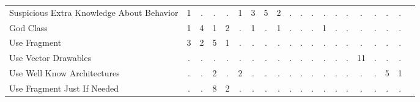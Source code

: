 \begin{table*}[t]
\begin{tabular}{p{4cm}|p{.3cm}p{.3cm}p{.3cm}p{.3cm}p{.3cm}p{.3cm}p{.3cm}p{.3cm}p{.3cm}p{.4cm}p{.4cm}p{.4cm}p{.4cm}p{.4cm}p{.4cm}p{.4cm}p{.4cm}p{.4cm}p{.4cm}}
Suspicious Extra Knowledge About Behavior			& \multicolumn{1}{c}{1}	& \multicolumn{1}{c}{.}	& \multicolumn{1}{c}{.}	& \multicolumn{1}{c}{.}	& \multicolumn{1}{c}{1}	& \multicolumn{1}{c}{3}	& \multicolumn{1}{c}{5}	& \multicolumn{1}{c}{2}	& \multicolumn{1}{c}{.}	& \multicolumn{1}{c}{.}	& \multicolumn{1}{c}{.}	& \multicolumn{1}{c}{.}	& \multicolumn{1}{c}{.}	& \multicolumn{1}{c}{.}	& \multicolumn{1}{c}{.}	& \multicolumn{1}{c}{.}	& \multicolumn{1}{c}{.}	& \multicolumn{1}{c}{.} 		 \\
God Class											& \multicolumn{1}{c}{1}	& \multicolumn{1}{c}{4}	& \multicolumn{1}{c}{1}	& \multicolumn{1}{c}{2}	& \multicolumn{1}{c}{.}	& \multicolumn{1}{c}{1}	& \multicolumn{1}{c}{.}	& \multicolumn{1}{c}{1}	& \multicolumn{1}{c}{.}	& \multicolumn{1}{c}{.}	& \multicolumn{1}{c}{.}	& \multicolumn{1}{c}{1}	& \multicolumn{1}{c}{.}	& \multicolumn{1}{c}{.}	& \multicolumn{1}{c}{.}	& \multicolumn{1}{c}{.}	& \multicolumn{1}{c}{.}	& \multicolumn{1}{c}{.} 		 \\
Use Fragment										& \multicolumn{1}{c}{3}	& \multicolumn{1}{c}{2}	& \multicolumn{1}{c}{5}	& \multicolumn{1}{c}{1}	& \multicolumn{1}{c}{.}	& \multicolumn{1}{c}{.}	& \multicolumn{1}{c}{.}	& \multicolumn{1}{c}{.}	& \multicolumn{1}{c}{.}	& \multicolumn{1}{c}{.}	& \multicolumn{1}{c}{.}	& \multicolumn{1}{c}{.}	& \multicolumn{1}{c}{.}	& \multicolumn{1}{c}{.}	& \multicolumn{1}{c}{.}	& \multicolumn{1}{c}{.}	& \multicolumn{1}{c}{.}	& \multicolumn{1}{c}{.} 		 \\
Use Vector Drawables								& \multicolumn{1}{c}{.}	& \multicolumn{1}{c}{.}	& \multicolumn{1}{c}{.}	& \multicolumn{1}{c}{.}	& \multicolumn{1}{c}{.}	& \multicolumn{1}{c}{.}	& \multicolumn{1}{c}{.}	& \multicolumn{1}{c}{.}	& \multicolumn{1}{c}{.}	& \multicolumn{1}{c}{.}	& \multicolumn{1}{c}{.}	& \multicolumn{1}{c}{.}	& \multicolumn{1}{c}{.}	& \multicolumn{1}{c}{.}	& \multicolumn{1}{c}{11}	& \multicolumn{1}{c}{.}	& \multicolumn{1}{c}{.}	& \multicolumn{1}{c}{.} 	 \\
Use Well Know Architectures							& \multicolumn{1}{c}{.}	& \multicolumn{1}{c}{.}	& \multicolumn{1}{c}{2}	& \multicolumn{1}{c}{.}	& \multicolumn{1}{c}{2}	& \multicolumn{1}{c}{.}	& \multicolumn{1}{c}{.}	& \multicolumn{1}{c}{.}	& \multicolumn{1}{c}{.}	& \multicolumn{1}{c}{.}	& \multicolumn{1}{c}{.}	& \multicolumn{1}{c}{.}	& \multicolumn{1}{c}{.}	& \multicolumn{1}{c}{.}	& \multicolumn{1}{c}{.}	& \multicolumn{1}{c}{.}	& \multicolumn{1}{c}{5}	& \multicolumn{1}{c}{1} 		 \\
Use Fragment Just If Needed							& \multicolumn{1}{c}{.}	& \multicolumn{1}{c}{.}	& \multicolumn{1}{c}{8}	& \multicolumn{1}{c}{2}	& \multicolumn{1}{c}{.}	& \multicolumn{1}{c}{.}	& \multicolumn{1}{c}{.}	& \multicolumn{1}{c}{.}	& \multicolumn{1}{c}{.}	& \multicolumn{1}{c}{.}	& \multicolumn{1}{c}{.}	& \multicolumn{1}{c}{.}	& \multicolumn{1}{c}{.}	& \multicolumn{1}{c}{.}	& \multicolumn{1}{c}{.}	& \multicolumn{1}{c}{.}	& \multicolumn{1}{c}{.}	& \multicolumn{1}{c}{.} 		 \\

\end{tabular}
\end{table*}
